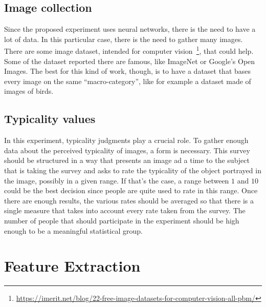 \documentclass[conference]{IEEEtran}
\begin{document}
	\subsection{Image collection}
		
		Since the proposed experiment uses neural networks, there is the need to have a lot of data. In this particular case, there is the need to gather many images. There are some image dataset, intended for computer 
		vision~\footnote{\url{https://imerit.net/blog/22-free-image-datasets-for-computer-vision-all-pbm/}}, that could help. Some of the dataset reported there are famous, like ImageNet or Google's Open Images. The 
		best for this kind of work, though, is to have a dataset that bases every image on the same ``macro-category'', like for example a dataset made of images of birds.
	
	\subsection{Typicality values}
		
		In this experiment, typicality judgments play a crucial role. To gather enough data about the perceived typicality of images, a form is necessary. This survey should be structured in a way that presents an 
		image ad a time to the subject that is taking the survey and asks to rate the typicality of the object portrayed in the image, possibly in a given range. If that's the case, a range between $1$ and $10$ 
		could be the best decision since people are quite used to rate in this range. Once there are enough results, the various rates should be averaged so that there is a single measure that takes into 
		account every rate taken from the survey. The number of people that should participate in the experiment should be high enough to be a meaningful statistical group.

\section{Feature Extraction}
\end{document}
